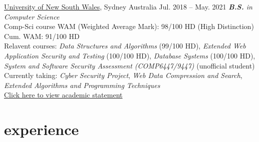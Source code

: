\documentclass[hidelinks__VERSION__]{adamyi-cv}
\begin{document}
\begin{entrylist}


\entry
{\href{https://unsw.edu.au}{University of New South Wales}, Sydney Australia}
{Jul. 2018 -- May. 2021}
{\emph{\textbf{B.S.} in Computer Science}\\
Comp-Sci course WAM (Weighted Average Mark): 98/100 HD (High Distinction)\\Cum. WAM: 91/100 HD\\
Relavent courses: \emph{Data Structures and Algorithms} (99/100 HD), \emph{Extended Web Application Security and Testing} (100/100 HD), \emph{Database Systems} (100/100 HD), \emph{System and Software Security Assessment (COMP6447/9447)} (unofficial student)\\
Currently taking: \emph{Cyber Security Project}, \emph{Web Data Compression and Search}, \emph{Extended Algorithms and Programming Techniques}\\
\href{https://drive.google.com/file/d/1Ntpk90ChuyKeYaIsLXnpJiXGrVlyAPxI/view}{Click here to view academic statement}
}

\end{entrylist}


\section{experience}
\end{document}
